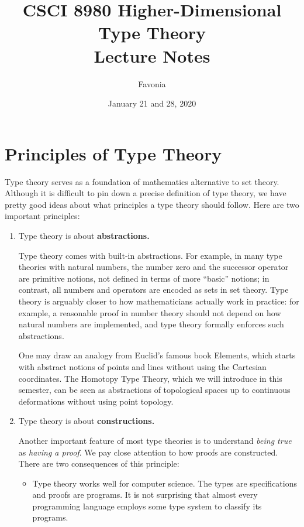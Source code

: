 \documentclass{article}
\title{CSCI 8980 Higher-Dimensional Type Theory\\ Lecture Notes}
\author{Favonia}
\date{January 21 and 28, 2020}
\begin{document}
\maketitle

\section{Principles of Type Theory}

Type theory serves as a foundation of mathematics alternative to set theory. Although it is difficult to pin down a precise definition of type theory, we have pretty good ideas about what principles a type theory should follow. Here are two important principles:
\begin{enumerate}
  \item Type theory is about \textbf{abstractions.}

    Type theory comes with built-in abstractions. For example, in many type theories with natural numbers, the number zero and the successor operator are primitive notions, not defined in terms of more ``basic'' notions; in contrast, all numbers and operators are encoded as sets in set theory. Type theory is arguably closer to how mathematicians actually work in practice: for example, a reasonable proof in number theory should not depend on how natural numbers are implemented, and type theory formally enforces such abstractions.

    One may draw an analogy from Euclid's famous book Elements, which starts with abstract notions of points and lines without using the Cartesian coordinates. The Homotopy Type Theory, which we will introduce in this semester, can be seen as abstractions of topological spaces up to continuous deformations without using point topology.

  \item Type theory is about \textbf{constructions.}

    Another important feature of most type theories is to understand \emph{being true} as \emph{having a proof}. We pay close attention to how proofs are constructed. There are two consequences of this principle:
    \begin{itemize}
      \item Type theory works well for computer science. The types are specifications and proofs are programs. It is not surprising that almost every programming language employs some type system to classify its programs.


\end{itemize}
\end{enumerate}
\end{document}
